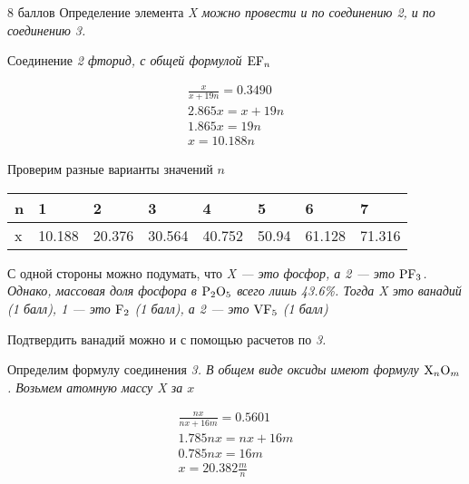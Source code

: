 \begin{solbox}{8 баллов}
  Определение элемента \em{X} можно провести и по соединению \em{2}, и по соединению \em{3}.

  Соединение \em{2} фторид, с общей формулой $\ce{EF_n}$

  \begin{gather*}
    \frac{x}{x + 19n} = 0.3490 \\
    2.865 x = x + 19n \\
    1.865 x = 19 n \\
    x = 10.188 n
  \end{gather*}

  Проверим разные варианты значений $n$

  \begin{tabularx}{\textwidth}{|X|X|X|X|X|X|X|X|}
    \hline
    n & 1 & 2 & 3 & 4 & 5 & 6 & 7 \\
    \hline
    x & 10.188 & 20.376 & 30.564 & 40.752 & 50.94 & 61.128 & 71.316 \\
    \hline
  \end{tabularx}

  С одной стороны можно подумать, что \em{X} — это фосфор, а \em{2} — это $\ce{PF3}$. Однако, массовая доля фосфора в $\ce{P2O5}$ всего лишь 43.6\%. Тогда \em{X} это ванадий (1 балл), \em{1} — это $\ce{F2}$ (1 балл), а \em{2} — это $\ce{VF5}$ (1 балл)

  Подтвердить ванадий можно и с помощью расчетов по \em{3}.
  
  Определим формулу соединения \em{3}. В общем виде оксиды имеют формулу $\ce{X_nO_m}$. Возьмем атомную массу \em{X} за $x$

  \begin{gather*}
    \frac{nx}{nx + 16m} = 0.5601 \\
    1.785 nx = nx + 16m \\
    0.785 nx = 16m \\
    x = 20.382 \frac{m}{n}
  \end{gather*}
\end{solbox}
  
